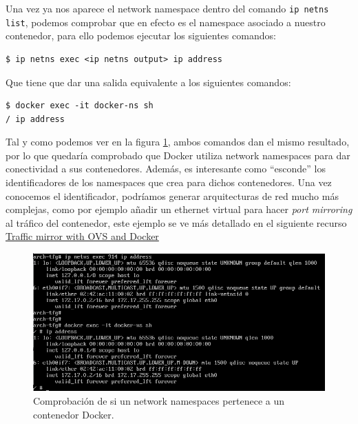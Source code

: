 \documentclass[a4paper, oneside, 12pt]{book}
\begin{document}
	\noindent Una vez ya nos aparece el network namespace dentro del comando \texttt{ip netns list}, podemos comprobar que en efecto es el namespace asociado a nuestro contenedor, para ello podemos ejecutar los siguientes comandos:
	
	\begin{verbatim}
$ ip netns exec <ip netns output> ip address
	\end{verbatim}

	\noindent Que tiene que dar una salida equivalente a los siguientes comandos:
	
	\begin{verbatim}
$ docker exec -it docker-ns sh
/ ip address
	\end{verbatim}

	\noindent Tal y como podemos ver en la figura \ref{img: comprobacion ns docker}, ambos comandos dan el mismo resultado, por lo que quedaría comprobado que Docker utiliza network namespaces para dar conectividad a sus contenedores. Además, es interesante como ``esconde'' los identificadores de los namespaces que crea para dichos contenedores. Una vez conocemos el identificador, podríamos generar arquitecturas de red mucho más complejas, como por ejemplo añadir un ethernet virtual para hacer \textit{port mirroring} al tráfico del contenedor, este ejemplo se ve más detallado en el siguiente recurso \href{https://arthurchiao.art/blog/traffic-mirror-with-ovs/}{Traffic mirror with OVS and Docker}

	\pagebreak

	\begin{figure}[h!]
		\begin{center}
			\includegraphics[width=1\textwidth]{img/docker_ns4.png}
			\caption{Comprobación de si un network namespaces pertenece a un contenedor Docker.}
			\label{img: comprobacion ns docker}
		\end{center}
	\end{figure}
\end{document}
